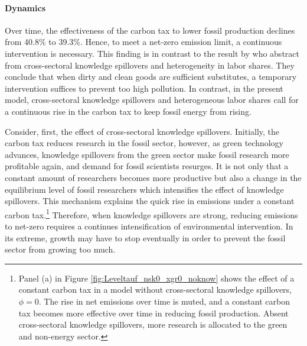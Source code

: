 \paragraph{Dynamics}

Over time, the effectiveness of the carbon tax to lower fossil production declines from 40.8\% to 39.3\%. Hence, to meet a net-zero emission limit, a continuous intervention is necessary. 
This finding is in contrast to the result by \cite{Acemoglu2012TheChange} who abstract from cross-sectoral knowledge spillovers and heterogeneity in labor shares. They conclude that when dirty and clean goods are sufficient substitutes, a temporary intervention suffices to prevent too high pollution. In contrast, in the present model, cross-sectoral knowledge spillovers and heterogeneous labor shares 
call for a continuous rise in the carbon tax to keep fossil energy from rising. 

Consider, first, the effect of cross-sectoral knowledge spillovers.
Initially, the carbon tax reduces research in the fossil sector, however, as green technology advances, knowledge spillovers from the green sector make fossil research more profitable again, and demand for fossil scientists resurges.
It is not only that a constant amount of researchers becomes more productive but also a change in the equilibrium level of fossil researchers which intensifies the effect of knowledge spillovers. This mechanism explains the quick rise in emissions under a constant carbon tax.\footnote{ Panel (a) in Figure \ref{fig:Leveltauf_nsk0_xgr0_noknow} shows the effect of a constant carbon tax in a model without cross-sectoral knowledge spillovers, $\phi=0$. The rise in net emissions over time is muted, and a constant carbon tax becomes more effective over time in reducing fossil production.  Absent cross-sectoral knowledge spillovers, more research is allocated to the green and non-energy sector.} 
Therefore, when knowledge spillovers are strong, reducing emissions to net-zero requires a continues intensification of environmental intervention. In its extreme, growth may have to stop eventually in order to prevent the fossil sector from growing too much.

